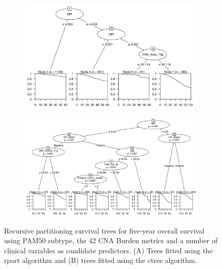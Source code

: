 \begin{figure}[!htb]
\centering

\vspace{1cm}

\begin{subfigure}{\textwidth}
\subcaption{}
\includegraphics[width=1\textwidth]{../figures/Appendices/Appendix_B/Clin_PA_PartyKit_Survival_Burden_FiveYearOS_PAM50.png}
\end{subfigure}

\vspace{2cm}

\begin{subfigure}{\textwidth}
\subcaption{}
\includegraphics[width=1\textwidth]{../figures/Appendices/Appendix_B/Clin_PA_Ctree_Survival_Burden_FiveYearOS_PAM50.png}
\end{subfigure}

\vspace{1cm}

\caption[Recursive partitioning survival trees for five-year overall survival using PAM50 subtype, the 42 CNA Burden metrics and a number of clinical variables as candidate predictors.]{Recursive partitioning survival trees for five-year overall survival using PAM50 subtype, the 42 CNA Burden metrics and a number of clinical variables as candidate predictors. (A) Trees fitted using the rpart algorithm and (B) trees fitted using the ctree algorithm.}
\end{figure}

